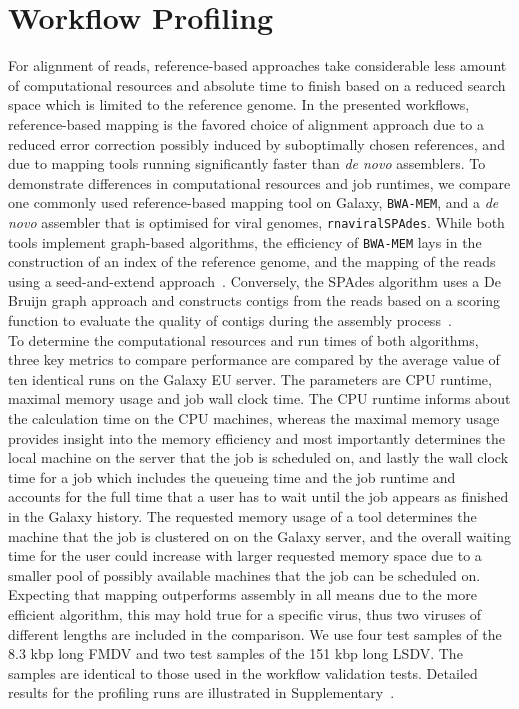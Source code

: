 \section{Workflow Profiling}
For alignment of reads, reference-based approaches take considerable less amount of computational resources and absolute time to finish based on a reduced search space which is limited to the reference genome. In the presented workflows, reference-based mapping is the favored choice of alignment approach due to a reduced error correction possibly induced by suboptimally chosen references, and due to mapping tools running significantly faster than \textit{de novo} assemblers. To demonstrate differences in computational resources and job runtimes, we compare one commonly used reference-based mapping tool on Galaxy, \texttt{BWA-MEM}, and a \textit{de novo} assembler that is optimised for viral genomes, \texttt{rnaviralSPAdes}. While both tools implement graph-based algorithms, the efficiency of \texttt{BWA-MEM} lays in the construction of an index of the reference genome, and the mapping of the reads using a seed-and-extend approach~\cite{li2013aligning}. Conversely, the SPAdes algorithm uses a De Bruijn graph approach and constructs contigs from the reads based on a scoring function to evaluate the quality of contigs during the assembly process~\cite{bankevich2012spades}. \\
To determine the computational resources and run times of both algorithms, three key metrics to compare performance are compared by the average value of ten identical runs on the Galaxy EU server. The parameters are CPU runtime, maximal memory usage and job wall clock time. The CPU runtime informs about the calculation time on the CPU machines, whereas the maximal memory usage provides insight into the 
memory efficiency and most importantly determines the local machine on the server that the job is scheduled on, and lastly the wall clock time for a job which includes the queueing time and the job runtime and accounts for the full time that a user has to wait until the job appears as finished in the Galaxy history. The requested memory usage of a tool determines the machine that the job is clustered on on the Galaxy server, and the overall waiting time for the user could increase with larger requested memory space due to a smaller pool of possibly available machines that the job can be scheduled on.\\
Expecting that mapping outperforms assembly in all means due to the more efficient algorithm, this may hold true for a specific virus, thus two viruses of different lengths are included in the comparison. We use four test samples of the 8.3 kbp long \ac{FMDV} and two test samples of the 151 kbp long \ac{LSDV}. The samples are identical to those used in the workflow validation tests. Detailed results for the profiling runs are illustrated in Supplementary~. \\

